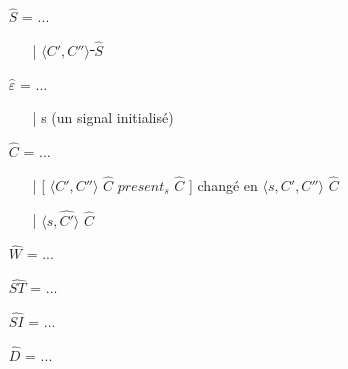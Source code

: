 \documentclass[10pt,a4paper]{article}
\begin{document}
				\begin{itemize}
					\item[] $\widehat{S}$  = ... 
					\begin{itemize}
						\item[|] \sout{$\langle C',C''\rangle$ $\widehat{S}$}
					\end{itemize}
					\item[] $\widehat{\varepsilon}$ = ... 
					\begin{itemize}
						\item[|] s (un signal initialisé)
					\end{itemize}
					\item[] $\widehat{C}$  = ... 
					\begin{itemize}
						\item[|] [ $\langle C',C''\rangle$ $\widehat{C}$ $present_{s}$ $\widehat{C}$ ] changé en $\langle s,C',C''\rangle$ $\widehat{C}$
						\item[|] $\langle s,\widehat{C'}\rangle$ $\widehat{C}$ 
					\end{itemize}
					\item[] $\widehat{W}$  = ...
					\item[] $\widehat{ST}$ = ...
					\item[] $\widehat{SI}$ = ...
					\item[] $\widehat{D}$  = ...
				\end{itemize}
				\bigbreak
				\bigbreak
				
\end{document}

